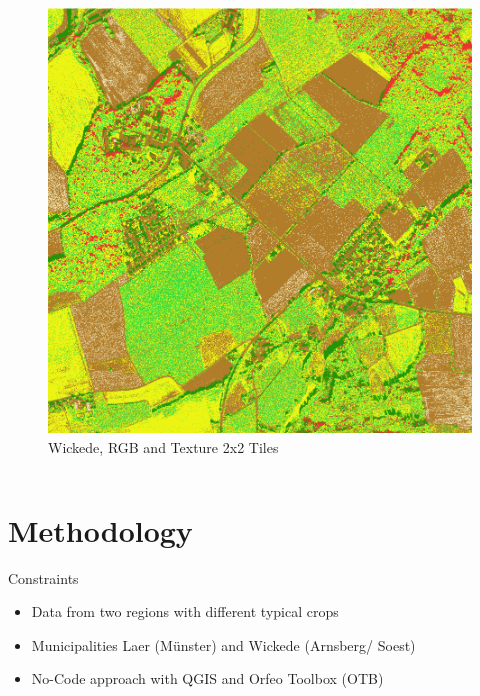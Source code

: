 \documentclass[
  t,%
]{_style/tudelft-beamerposter}
\begin{document}
\begin{frame}
\begin{columns}[onlytextwidth, T]
\begin{column}{}
\begin{columns}[T]
            \begin{column}{}
                \begin{figure}
                    \begin{center}
                        \includegraphics[scale=0.45]{graphs/textureAndColour2x2wickede.png}
                        \caption{Wickede, RGB and Texture 2x2 Tiles}
                        \label{fig:topCenter}
                    \end{center}     
                \end{figure}
                         
            \end{column}
        \end{columns}
        
      \section*{Methodology}
      \begin{block}{Constraints}
        \begin{itemize}
          \item Data from two regions with different typical crops
          \item Municipalities Laer (Münster) and Wickede (Arnsberg/ Soest)
          \item No-Code approach with QGIS and Orfeo Toolbox (OTB)
        \end{itemize}
      \end{block}
      

\end{column}
\end{columns}
\end{frame}
\end{document}

